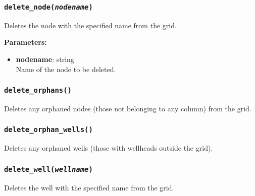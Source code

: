 \begin{snugshade}\subsubsection{\texttt{delete\_node(\emph{nodename})}}\end{snugshade}
\label{sec:mulgrid:delete_node}

Deletes the node with the specified name from the grid.

\textbf{Parameters:}
\begin{itemize}
\item \textbf{nodename}: string\\
  Name of the node to be deleted.
\end{itemize}

\begin{snugshade}\subsubsection{\texttt{delete\_orphans()}}\end{snugshade}
\label{sec:mulgrid:delete_orphans}

Deletes any orphaned nodes (those not belonging to any column) from the grid.

\begin{snugshade}\subsubsection{\texttt{delete\_orphan\_wells()}}\end{snugshade}
\label{sec:mulgrid:delete_orphan_wells}

Deletes any orphaned wells (those with wellheads outside the grid).

\begin{snugshade}\subsubsection{\texttt{delete\_well(\emph{wellname})}}\end{snugshade}
\label{sec:mulgrid:delete_well}

Deletes the well with the specified name from the grid.

